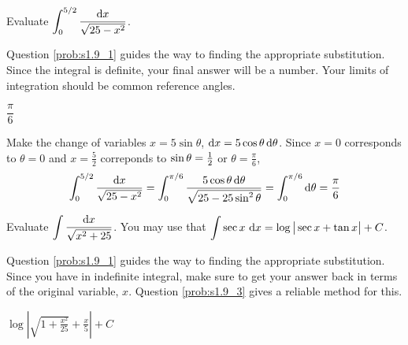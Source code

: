 \begin{Mquestion}[M105 2013A]
Evaluate $\displaystyle\int_0^{5/2} \frac{\mathrm{d}x}{\sqrt{25-x^2}}$.
\end{Mquestion}

\begin{hint} 
Question \ref{prob:s1.9_1} guides the way to finding the appropriate substitution.
Since the integral is definite, your final answer will be a number. Your limits of integration should be common reference angles.
\end{hint}

\begin{answer} 
$\dfrac{\pi}{6}$ 
\end{answer}

\begin{solution} 
 Make the change of variables $x=5\sin\theta$, $\mathrm{d}x=5\cos\theta\,\mathrm{d}\theta$. 
Since $x=0$ corresponds to $\theta=0$ and $x=\frac{5}{2}$ correponds to
$\sin\theta=\tfrac{1}{2}$ or $\theta =\frac{\pi}{6}$,
\begin{align*}
\int_0^{5/2} \frac{\mathrm{d}x}{\sqrt{25-x^2}}
=\int_0^{\pi/6} \frac{5\cos\theta\,\mathrm{d}\theta}{\sqrt{25-25\sin^2\theta}}
=\int_0^{\pi/6} \mathrm{d}\theta
=\frac{\pi}{6}
\end{align*}
\end{solution}

\begin{Mquestion}[M105 2015A]
Evaluate $\displaystyle\int \frac{\mathrm{d}x}{\sqrt{x^2+25}}$.
You may use that 
${\displaystyle\int} \sec x\ \mathrm{d}x = \log\big|\sec x+\tan x\big|+C$.
\end{Mquestion}

\begin{hint} 
Question \ref{prob:s1.9_1} guides the way to finding the appropriate substitution. Since you have in indefinite integral, make sure to get your answer back in terms of the original variable, $x$. Question \ref{prob:s1.9_3} gives a reliable method for this.
\end{hint}

\begin{answer} 
$\displaystyle\log\left|\sqrt{1+\frac{x^2}{25}}+\frac{x}{5}\right|+C$
\end{answer}

